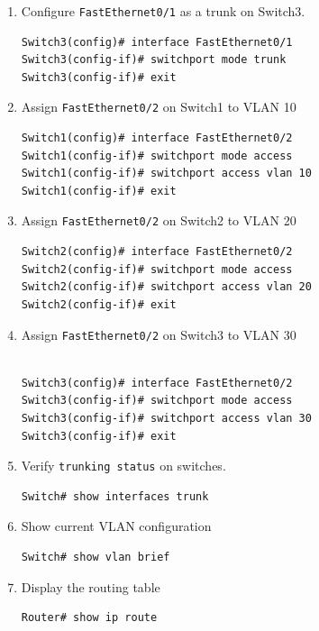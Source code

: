 \documentclass[a4paper]{book}
\begin{document}
\begin{enumerate}
\item{Configure \texttt{FastEthernet0/1} as a trunk on Switch3.}
\begin{lstlisting}
Switch3(config)# interface FastEthernet0/1
Switch3(config-if)# switchport mode trunk
Switch3(config-if)# exit
\end{lstlisting}

\item{Assign \texttt{FastEthernet0/2} on Switch1 to VLAN 10}

\begin{lstlisting}
Switch1(config)# interface FastEthernet0/2
Switch1(config-if)# switchport mode access
Switch1(config-if)# switchport access vlan 10
Switch1(config-if)# exit
\end{lstlisting}

\item{Assign \texttt{FastEthernet0/2} on Switch2 to VLAN 20}

\begin{lstlisting}
Switch2(config)# interface FastEthernet0/2
Switch2(config-if)# switchport mode access
Switch2(config-if)# switchport access vlan 20
Switch2(config-if)# exit
\end{lstlisting}

\item{Assign \texttt{FastEthernet0/2} on Switch3 to VLAN 30}
\begin{lstlisting}

Switch3(config)# interface FastEthernet0/2
Switch3(config-if)# switchport mode access
Switch3(config-if)# switchport access vlan 30
Switch3(config-if)# exit
\end{lstlisting}


\item{Verify \texttt{trunking status} on switches.}

\begin{lstlisting}
Switch# show interfaces trunk
\end{lstlisting}

\item{Show current VLAN configuration}

\begin{lstlisting}
Switch# show vlan brief
\end{lstlisting}

\item{Display the routing table}

\begin{lstlisting}
Router# show ip route
\end{lstlisting}


\end{enumerate}
\end{document}

